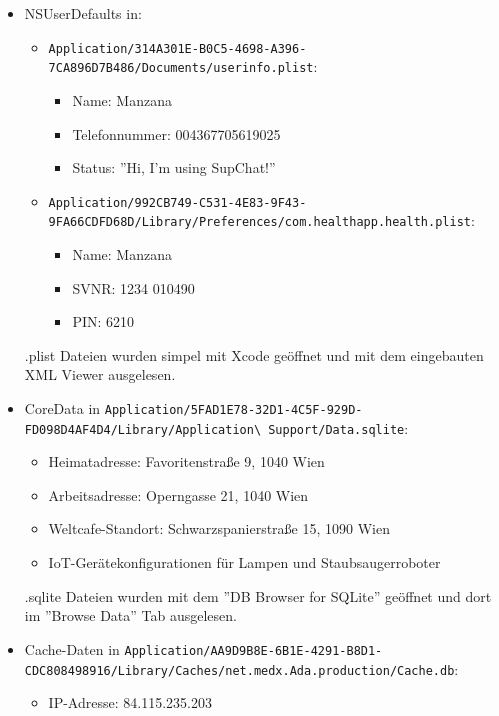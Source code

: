 \documentclass[12pt, a4paper, titlepage, oneside]{scrartcl}
\begin{document}
	\begin{itemize}
		\item NSUserDefaults in:
			\begin{itemize}
				\item \lstinline{Application/314A301E-B0C5-4698-A396-7CA896D7B486/Documents/userinfo.plist}:
					\begin{itemize}
						\item Name: Manzana

						\item Telefonnummer: 004367705619025

						\item Status: ''Hi, I'm using SupChat!''
					\end{itemize}

				\item \lstinline{Application/992CB749-C531-4E83-9F43-9FA66CDFD68D/Library/Preferences/com.healthapp.health.plist}:
					\begin{itemize}
						\item Name: Manzana

						\item SVNR: 1234 010490

						\item PIN: 6210
					\end{itemize}
			\end{itemize}
			.plist Dateien wurden simpel mit Xcode geöffnet und mit dem eingebauten XML
			Viewer ausgelesen.

		\item CoreData in \lstinline{Application/5FAD1E78-32D1-4C5F-929D-FD098D4AF4D4/Library/Application\ Support/Data.sqlite}:
			\begin{itemize}
				\item Heimatadresse: Favoritenstraße 9, 1040 Wien

				\item Arbeitsadresse: Operngasse 21, 1040 Wien

				\item Weltcafe-Standort: Schwarzspanierstraße 15, 1090 Wien

				\item IoT-Gerätekonfigurationen für Lampen und Staubsaugerroboter
			\end{itemize}

			.sqlite Dateien wurden mit dem ''DB Browser for SQLite'' geöffnet und dort
			im ''Browse Data'' Tab ausgelesen.

		\item Cache-Daten in \lstinline{Application/AA9D9B8E-6B1E-4291-B8D1-CDC808498916/Library/Caches/net.medx.Ada.production/Cache.db}:
			\begin{itemize}
				\item IP-Adresse: 84.115.235.203


\end{itemize}
\end{itemize}
\end{document}
